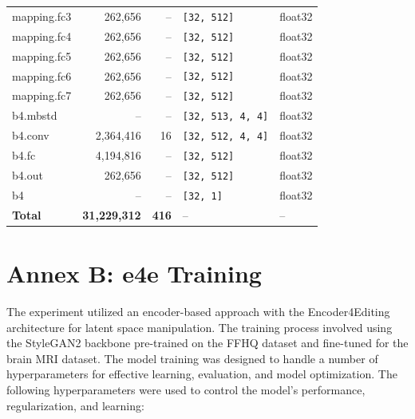 \begin{footnotesize}
\begin{longtable}{@{}lrrll@{}}
mapping.fc3    & 262{,}656 & -- & \texttt{[32, 512]}           & float32 \\
mapping.fc4    & 262{,}656 & -- & \texttt{[32, 512]}           & float32 \\
mapping.fc5    & 262{,}656 & -- & \texttt{[32, 512]}           & float32 \\
mapping.fc6    & 262{,}656 & -- & \texttt{[32, 512]}           & float32 \\
mapping.fc7    & 262{,}656 & -- & \texttt{[32, 512]}           & float32 \\
b4.mbstd       & --       & --  & \texttt{[32, 513, 4, 4]}     & float32 \\
b4.conv        & 2{,}364{,}416 & 16 & \texttt{[32, 512, 4, 4]} & float32 \\
b4.fc          & 4{,}194{,}816 & -- & \texttt{[32, 512]}        & float32 \\
b4.out         & 262{,}656 & -- & \texttt{[32, 512]}           & float32 \\
b4             & --       & --  & \texttt{[32, 1]}             & float32 \\
\midrule
\textbf{Total} & \textbf{31{,}229{,}312} & \textbf{416} & -- & -- \\
\bottomrule
\end{longtable}
\end{footnotesize}

\section{Annex B: e4e Training}

The experiment utilized an encoder-based approach with the Encoder4Editing architecture for latent space manipulation. The training process involved using the StyleGAN2 backbone pre-trained on the FFHQ dataset and fine-tuned for the brain MRI dataset. The model training was designed to handle a number of hyperparameters for effective learning, evaluation, and model optimization. The following hyperparameters were used to control the model's performance, regularization, and learning:


